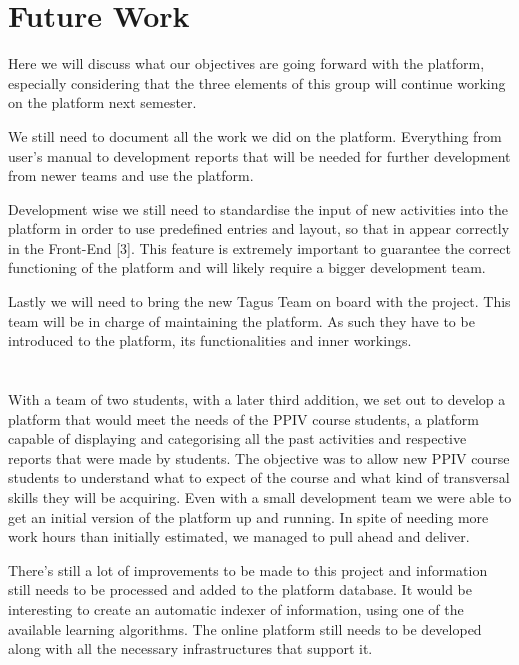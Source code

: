 \documentclass[a4paper,12pt,journal,twoside,compsoc]{PPIEEEtran}
\begin{document}

\section{Future Work}

Here we will discuss what our objectives are going forward with the platform, especially considering that the three elements of this group will continue working on the platform next semester.

We still need to document all the work we did on the platform. Everything from user's manual to development reports that will be needed for further development from newer teams and use the platform.

Development wise we still need to standardise the input of new activities into the platform in order to use predefined entries and layout, so that in appear correctly in the Front-End [3]. This feature is extremely important to guarantee the correct functioning of the platform and will likely require a bigger development team.

Lastly we will need to bring the new Tagus Team on board with the project. This team will be in charge of maintaining the platform. As such they have to be introduced to the platform, its functionalities and inner workings.

\section{}

With a team of two students, with a later third addition, we set out to develop a platform that would meet the needs of the PPIV course students, a platform capable of displaying and categorising all the past activities and respective reports that were made by students. The objective was to allow new PPIV course students to understand what to expect of the course and what kind of  transversal skills they will be acquiring. Even with a small development team we were able to get an initial version of the platform up and running. In spite of needing more work hours than initially estimated, we managed to pull ahead and deliver.

There's still a lot of improvements to be made to this project and information still needs to be processed and added to the platform database. It would be interesting to create an automatic indexer of information, using one of the available learning algorithms. The online platform still needs to be developed along with all the necessary infrastructures that support it.
\end{document}
